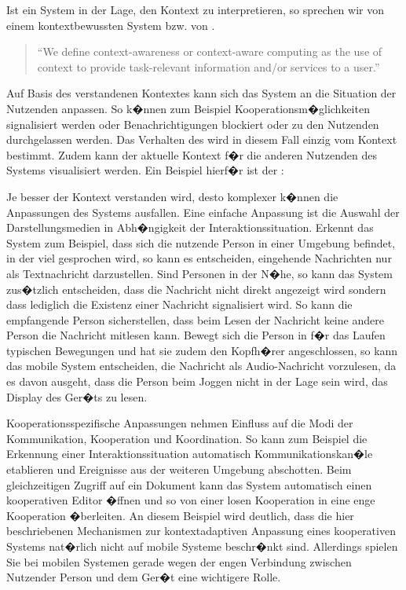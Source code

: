 Ist ein System in der Lage, den Kontext zu interpretieren, so sprechen wir von einem kontextbewussten System bzw. von .

\begin{quote}
``We define context-awareness or context-aware computing as the use of context to provide task-relevant information and/or services to a user.''  
\end{quote}

Auf Basis des verstandenen Kontextes kann sich das System an die Situation der Nutzenden anpassen. So k�nnen zum Beispiel Kooperationsm�glichkeiten signalisiert werden oder Benachrichtigungen blockiert oder zu den Nutzenden durchgelassen werden. Das Verhalten des  wird in diesem Fall einzig vom Kontext bestimmt. Zudem kann der aktuelle Kontext f�r die anderen Nutzenden des Systems visualisiert werden. Ein Beispiel hierf�r ist der :


Je besser der Kontext verstanden wird, desto komplexer k�nnen die Anpassungen des Systems ausfallen. Eine einfache Anpassung ist die Auswahl der Darstellungsmedien in Abh�ngigkeit der Interaktionssituation. Erkennt das System zum Beispiel, dass sich die nutzende Person in einer Umgebung befindet, in der viel gesprochen wird, so kann es entscheiden, eingehende Nachrichten nur als Textnachricht darzustellen. Sind Personen in der N�he, so kann das System zus�tzlich entscheiden, dass die Nachricht nicht direkt angezeigt wird sondern dass lediglich die Existenz einer Nachricht signalisiert wird. So kann die empfangende Person sicherstellen, dass beim Lesen der Nachricht keine andere Person die Nachricht mitlesen kann. Bewegt sich die Person in f�r das Laufen typischen Bewegungen und hat sie zudem den Kopfh�rer angeschlossen, so kann das mobile System entscheiden, die Nachricht als Audio-Nachricht vorzulesen, da es davon ausgeht, dass die Person beim Joggen nicht in der Lage sein wird, das Display des Ger�ts zu lesen. 

Kooperationsspezifische Anpassungen nehmen Einfluss auf die Modi der Kommunikation, Kooperation und Koordination. So kann zum Beispiel die Erkennung einer Interaktionssituation automatisch Kommunikationskan�le etablieren und Ereignisse aus der weiteren Umgebung abschotten. Beim gleichzeitigen Zugriff auf ein Dokument kann das System automatisch einen kooperativen Editor �ffnen und so von einer losen Kooperation in eine enge Kooperation �berleiten. An diesem Beispiel wird deutlich, dass die hier beschriebenen Mechanismen zur kontextadaptiven Anpassung eines kooperativen Systems nat�rlich nicht auf mobile Systeme beschr�nkt sind. Allerdings spielen Sie bei mobilen Systemen gerade wegen der engen Verbindung zwischen Nutzender Person und dem Ger�t eine wichtigere Rolle. 

